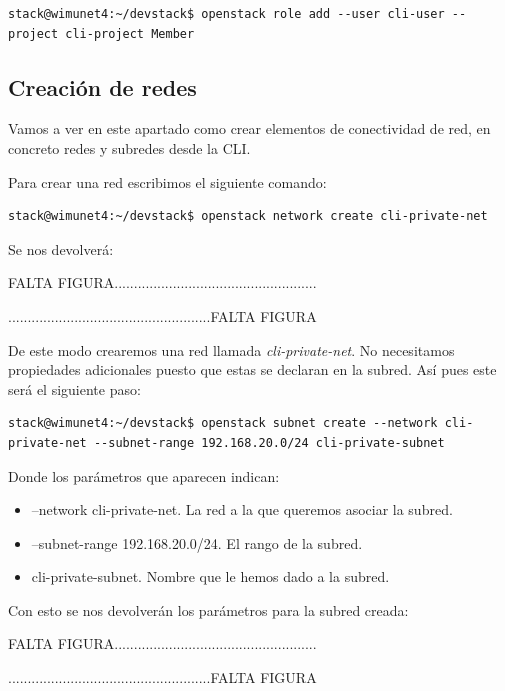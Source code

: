 \begin{lstlisting}[style=Consola]
stack@wimunet4:~/devstack$ openstack role add --user cli-user --project cli-project Member
\end{lstlisting}

\subsection{Creación de redes}
Vamos a ver en este apartado como crear elementos de conectividad de red, en concreto redes y subredes desde la CLI.

Para crear una red escribimos el siguiente comando:

\begin{lstlisting}[style=Consola]
stack@wimunet4:~/devstack$ openstack network create cli-private-net 
\end{lstlisting}

Se nos devolverá:

\begin{tcolorbox}[colback=green!5!white,colframe=green!75!black]
FALTA FIGURA....................................................

....................................................FALTA FIGURA
\end{tcolorbox}

De este modo crearemos una red llamada \textit{cli-private-net}. No necesitamos propiedades adicionales puesto que estas se declaran en la subred. Así pues este será el siguiente paso:

\begin{lstlisting}[style=Consola]
stack@wimunet4:~/devstack$ openstack subnet create --network cli-private-net --subnet-range 192.168.20.0/24 cli-private-subnet
\end{lstlisting}

Donde los parámetros que aparecen indican:
\begin{itemize}
\item --network cli-private-net. La red a la que queremos asociar la subred.
\item --subnet-range 192.168.20.0/24. El rango de la subred.
\item cli-private-subnet. Nombre que le hemos dado a la subred.
\end{itemize}

Con esto se nos devolverán los parámetros para la subred creada:

\begin{tcolorbox}[colback=green!5!white,colframe=green!75!black]
FALTA FIGURA....................................................

....................................................FALTA FIGURA
\end{tcolorbox}

